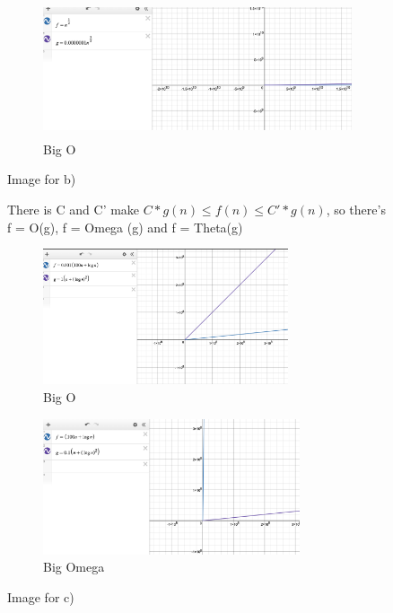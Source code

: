 \documentclass{article}
\begin{document}
\begin{enumerate}[label=(\alph*)]
\begin{figure}[h]
    \begin{subfigure}{0.5\textwidth}
    \includegraphics[width=0.9\linewidth, height=4cm]{b)big o.png }
    \caption{Big O}
    \label{fig:subim1}
    \end{subfigure}
    \caption{Image for b)}
    \label{fig:image2}
\end{figure}
\begin{figure}[h]
\item %
There is C and C' make $C*g(n) \le f(n) \le C'*g(n)$, so  there's f = O(g), f = Omega (g) and f = Theta(g)\\
    \begin{subfigure}{0.5\textwidth}
    \includegraphics[width=0.9\linewidth, height=4cm]{c)big O.png}
    \caption{Big O}
    \label{fig:subim1}
    \end{subfigure}
    \begin{subfigure}{0.5\textwidth}
    \includegraphics[width=0.9\linewidth, height=4cm]{c) big omega.png}
    \caption{Big Omega}
    \label{fig:subim2}
    \end{subfigure}
    \caption{Image for c)}
    \label{fig:image2}
\end{figure}
\item  %


\end{enumerate}
\end{document}
